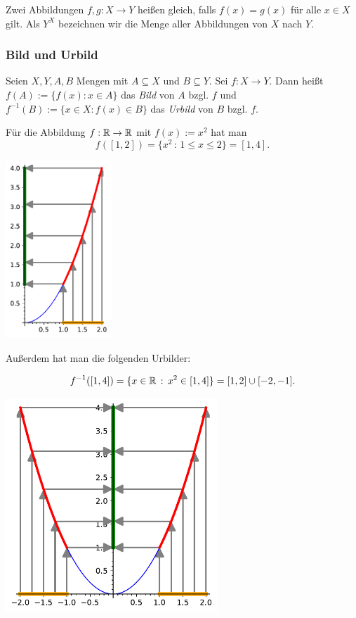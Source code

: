 Zwei Abbildungen $ f,g : X \to Y $ heißen gleich, falls $ f(x) = g(x) $ für alle $ x \in X $ gilt. Als $ Y^X $ bezeichnen wir die Menge aller Abbildungen von $ X $ nach $ Y $.

\subsubsection{Bild und Urbild}

Seien $ X,Y,A,B $ Mengen mit $ A \subseteq X $ und $ B \subseteq Y $. Sei $ f : X \to Y $. Dann heißt $ f(A) := \{ f(x) : x \in A \} $ das \emph{Bild} von $ A $ bzgl. $ f $ und $ f^{-1}(B) := \{ x \in X : f(x) \in B \} $ das \emph{Urbild} von $ B $ bzgl. $ f $.

\begin{bsp}
	Für die Abbildung $ f : \mathbb R \to \mathbb R $ mit $ f(x) := x^2 $ hat man 
	\[
		 f( [1,2] ) = \{ x^2 \,:\, 1 \le x \le 2\} = [1,4] .
	\]
\begin{center}
	\includegraphics[width=0.3\textwidth]{sage/bild_abb.pdf}
\end{center} 
	
	Außerdem hat man die folgenden Urbilder: 
	
	\[
		 f^{-1}( [1,4] ) = \{ x \in \mathbb R \,:\, x^2  \in [1,4] \} = [1,2] \cup [-2,-1] .
	\] 
\begin{center}
	\includegraphics[width=0.6\textwidth]{sage/urbild_abb.pdf}
\end{center} 


\end{bsp}

